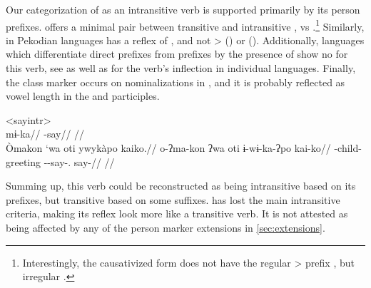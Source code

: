 Our categorization of  as an intransitive verb is supported primarily by its person prefixes.
\kalina offers a minimal pair between transitive   and intransitive  ,   vs   \parencite[288, 45]{courtz2008carib}.\footnote{Interestingly, the \kalina causativized form   does not have the regular > prefix , but irregular  \parencite[430]{courtz2008carib}.}
Similarly,  in Pekodian languages has a reflex of   , and not >  (\bakairi) or  (\PXin).
Additionally, languages which differentiate direct prefixes from  prefixes by the presence of  \parencite[495]{meira2010origin} show no  for this verb, see  as well as \textcites[294]{triomeira1999}[195]{wayanatavares2005}[288]{ikpengpacheco2001}[150]{alves2017arara}[168]{hoff1968carib} for the verb's inflection in individual languages.
Finally, the  class marker  occurs on nominalizations in \kalina {}, and it is probably reflected as vowel length in the \trio \parencite[333]{triomeira1999} and \wayana \parencite[196]{wayanatavares2005} participles.

\pex<sayintr>
 \akuriyo \parencite[][113]{meira1998proto}\\
\begingl
\gla mɨ-ka//
\glb {}-say//
\glft {}//
\endgl
{} \kalina \parencite[][202]{courtz2008carib}\\
\begingl
\glpreamble Òmakon `wa oti ywykàpo kaiko.//
\gla o-ʔma-kon ʔwa oti ɨ-wɨ-ka-ʔpo kai-ko//
\glb {}-child-  greeting --say-. say-//
\glft {}//
\endgl
\xe

Summing up, this verb could be reconstructed as being intransitive based on its prefixes, but transitive based on some suffixes.
\hixka has lost the main intransitive criteria, making its reflex look more like a transitive verb.
It is not attested as being affected by any of the person marker extensions  in \cref{sec:extensions}.


